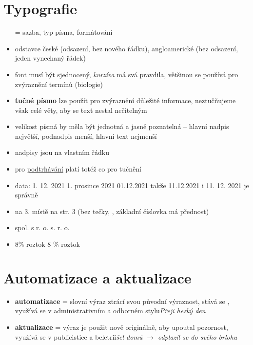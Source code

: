 \documentclass{memoir}
\begin{document}
\section*{Typografie}
\begin{itemize}
\item[=] sazba, typ písma, formátování
\item odstavce české (odsazení, bez nového řádku), angloamerické (bez odsazení, jeden vynechaný řádek)
\item font musí být sjednocený, \textit{kurzíva} má svá pravdila, většinou se používá pro zvýraznění termínů (biologie)
\item \textbf{tučné písmo} lze použít pro zvýraznění důležité informace, neztučňujeme však celé věty, aby se text nestal nečitelným
\item velikost písmá by měla být jednotná a jasně poznatelná -- hlavní nadpis největší, podnadpis menší, hlavní text nejmenší
\item nadpisy jsou na vlastním řádku
\item pro \underline{podtrhávání} platí totéž co pro tučnění
\item data: 1. 12. 2021 \hspace{1em} 1. prosince 2021 \hspace{1em} 01.12.2021 \hspace{1em} takže 11.12.2021 i 11. 12. 2021 je správně
\item na 3. místě \hspace{1em} na str. 3 (bez tečky, , základní číslovka má přednost)
\item spol. s r. o. \hspace{1em} s. r. o.
\item 8\% roztok \hspace{1em} 8 \% roztok
\end{itemize}

\section*{Automatizace a aktualizace}
	\begin{itemize}
		\item \textbf{automatizace} = slovní výraz ztrácí svou původní výraznost, stává se , využívá se v administrativním a odborném stylu\hfill\textit{Přeji hezký den}
		\item \textbf{aktualizace} = výraz je použit nově originálně, aby upoutal pozornost, využívá se v publicistice a beletrii\hfill\textit{šel domů $\rightarrow$ odplazil se do svého brlohu}
	\end{itemize}
\end{document}
